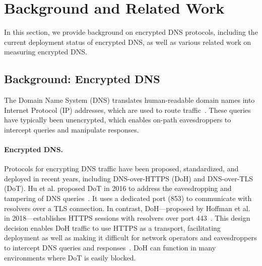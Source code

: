 \section{Background and Related Work}\label{sec:background}

In this section, we provide background on encrypted DNS protocols, including
the current deployment status of encrypted DNS, as well as various related
work on measuring encrypted DNS.

\subsection{Background: Encrypted DNS}

The Domain Name System (DNS) translates human-readable domain names into
Internet Protocol (IP) addresses, which are used to route
traffic~\cite{dns-rfcs}.  These queries have typically been unencrypted, which
enables on-path eavesdroppers to intercept queries and manipulate responses.


\paragraph{Encrypted DNS.}
Protocols for encrypting DNS traffic have been proposed, standardized, and
deployed in recent years, including DNS-over-HTTPS (DoH) and DNS-over-TLS
(DoT).  Hu et al. proposed DoT in 2016 to address the eavesdropping and
tampering of DNS queries~\cite{hu2016DoT}.  It uses a dedicated port (853)
to communicate with resolvers over a TLS connection.  In contrast,
DoH---proposed by Hoffman et al. in 2018---establishes HTTPS sessions with
resolvers over port 443~\cite{hoffman2018DoH}.  This design decision enables
DoH traffic to use HTTPS as a transport, facilitating deployment as well as
making it difficult for network operators and eavesdroppers to intercept DNS
queries and responses~\cite{boettger2019empirical}. DoH can function in many
environments where DoT is easily blocked.

